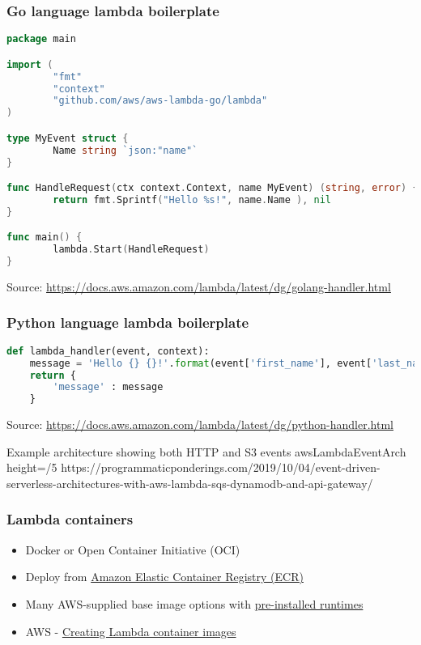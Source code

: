 \documentclass[11pt,aspectratio=169]{beamer}
\begin{document}
\begin{nrcanFrame}[fragile=singleslide]
    \frametitle{Go language lambda boilerplate}
  \centering
{\scriptsize
  \begin{lstlisting}[language=go]
package main

import (
        "fmt"
        "context"
        "github.com/aws/aws-lambda-go/lambda"
)

type MyEvent struct {
        Name string `json:"name"`
}

func HandleRequest(ctx context.Context, name MyEvent) (string, error) {
        return fmt.Sprintf("Hello %s!", name.Name ), nil
}

func main() {
        lambda.Start(HandleRequest)
}
  \end{lstlisting}
}
  {\tiny Source: \url{https://docs.aws.amazon.com/lambda/latest/dg/golang-handler.html}}
\end{nrcanFrame}





  \begin{nrcanFrame}[fragile=singleslide]
    \frametitle{Python language lambda boilerplate}
               {\footnotesize
                 \begin{lstlisting}[language=python]
def lambda_handler(event, context):
    message = 'Hello {} {}!'.format(event['first_name'], event['last_name'])  
    return { 
        'message' : message
    }
                 \end{lstlisting}
                 
                 \vspace{3cm}
                        {\tiny Source: \url{https://docs.aws.amazon.com/lambda/latest/dg/python-handler.html}}}
  \end{nrcanFrame}


\nrcanGraphicFrame
  {Example architecture showing both HTTP and S3 events}
  {awsLambdaEventArch}
  {height=/5}
  {https://programmaticponderings.com/2019/10/04/event-driven-serverless-architectures-with-aws-lambda-sqs-dynamodb-and-api-gateway/}


\begin{nrcanFrame}
  \frametitle{Lambda containers}
  \begin{itemize}
  \item Docker or Open Container Initiative (OCI)
  \item Deploy from \href{https://aws.amazon.com/ecr/}{Amazon Elastic Container Registry (ECR)}
  \item Many AWS-supplied base image options with \href{https://docs.aws.amazon.com/lambda/latest/dg/lambda-runtimes.html}{pre-installed runtimes}
  \item
    AWS - \href{https://docs.aws.amazon.com/lambda/latest/dg/images-create.html}{Creating
      Lambda container images}
  \end{itemize}
\end{nrcanFrame}
\end{document}
